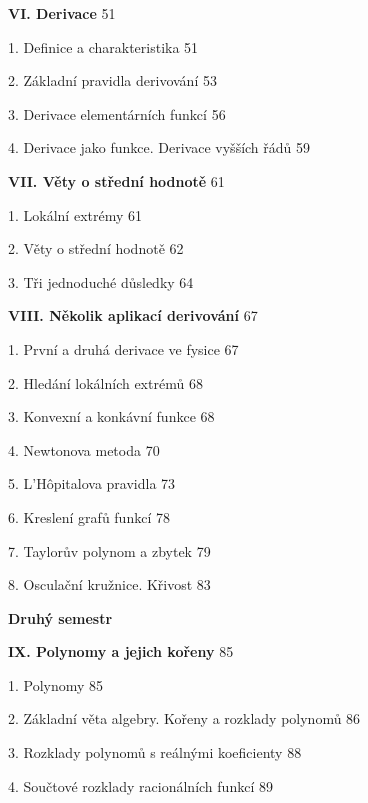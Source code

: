 \documentclass[12pt]{article}
\begin{document}
 \bigskip
 
 {\bf VI. Derivace} \hskip10mm 51
 
  \hskip5mm 1. Definice a charakteristika \hskip10mm 51
  
\hskip5mm 2. Základní pravidla derivování \hskip10mm 53

 \hskip5mm 3. Derivace elementárních funkcí \hskip10mm 56

 \hskip5mm 4. Derivace jako funkce. Derivace vyšších řádů \hskip10mm 59
 
 \bigskip
 
 {\bf VII. Věty o střední hodnotě} \hskip10mm  61
 
  \hskip5mm 1. Lokální extrémy \hskip10mm 61
  
   \hskip5mm 2. Věty o střední hodnotě  \hskip10mm 62
   
    \hskip5mm 3. Tři jednoduché důsledky  \hskip10mm 64
    
    \bigskip
    
    {\bf VIII. Několik aplikací derivování} \hskip10mm 67
    
\hskip5mm 1. První a druhá derivace ve fysice \hskip10mm 67

 \hskip5mm 2. Hledání lokálních extrémů  \hskip10mm 68
 
  \hskip5mm 3. Konvexní a konkávní funkce \hskip10mm 68
  
   \hskip5mm 4. Newtonova metoda \hskip10mm 70
   
    \hskip5mm 5. L'H\^{o}pitalova pravidla \hskip10mm 73
    
     \hskip5mm 6. Kreslení grafů funkcí  \hskip10mm 78
     
      \hskip5mm 7. Taylorův polynom a zbytek  \hskip10mm 79
      
       \hskip5mm 8. Osculační kružnice. Křivost \hskip10mm 83
 
 
 
 \vskip15mm
 
 \hskip20mm{\bf\large Druhý semestr}
 
 \vskip10mm
 
 
 {\bf IX. Polynomy a jejich kořeny} \hskip10mm 85
 
 \hskip5mm 1. Polynomy \hskip10mm 85
 
 \hskip5mm 2. Základní věta algebry.
 Kořeny a rozklady polynomů \hskip10mm 86
 
 \hskip5mm 3. Rozklady polynomů s reálnými koeficienty \hskip10mm 88
 
 \hskip5mm 4. Součtové rozklady racionálních funkcí \hskip10mm 89
 
\end{document}
